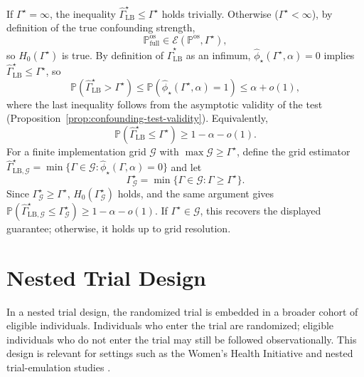 If \(\Gamma^\star = \infty\), the inequality \(\widehat{\Gamma}_{\mathrm{LB}}^{\star} \leq \Gamma^\star\) holds trivially. Otherwise (\(\Gamma^\star < \infty\)), by definition of the true confounding strength,
\[
  \mathbb{P}^{\mathrm{os}}_{\mathrm{full}}
  \in
  \mathcal{E}(\mathbb{P}^{\mathrm{os}},\Gamma^\star),
\]
so \(H_0(\Gamma^\star)\) is true. By definition of \(\widehat{\Gamma}_{\mathrm{LB}}^{\star}\) as an infimum, \(\widehat{\phi}_{\star}(\Gamma^\star,\alpha)=0\) implies \(\widehat{\Gamma}_{\mathrm{LB}}^{\star}\leq\Gamma^\star\), so
\[
  \mathbb{P}
  \left(
    \widehat{\Gamma}_{\mathrm{LB}}^{\star}>\Gamma^\star
  \right)
  \leq
  \mathbb{P}
  \left(
    \widehat{\phi}_{\star}(\Gamma^\star,\alpha)=1
  \right)
  \leq
  \alpha+o(1),
\]
where the last inequality follows from the asymptotic validity of the test (Proposition~\ref{prop:confounding-test-validity}). Equivalently,
\[
  \mathbb{P}
  \left(
    \widehat{\Gamma}_{\mathrm{LB}}^{\star}\leq\Gamma^\star
  \right)
  \geq
  1-\alpha-o(1).
\]
For a finite implementation grid \(\mathcal{G}\) with \(\max\mathcal{G}\geq\Gamma^\star\), define the grid estimator \(\widehat{\Gamma}_{\mathrm{LB},\mathcal{G}}^{\star}=\min\{\Gamma\in\mathcal{G}:\widehat{\phi}_{\star}(\Gamma,\alpha)=0\}\) and let
\[
  \Gamma^\star_{\mathcal{G}}
  =
  \min\{\Gamma\in\mathcal{G}:\Gamma\geq\Gamma^\star\}.
\]
Since \(\Gamma^\star_{\mathcal{G}}\geq\Gamma^\star\), \(H_0(\Gamma^\star_{\mathcal{G}})\) holds, and the same argument gives \(\mathbb{P}(\widehat{\Gamma}_{\mathrm{LB},\mathcal{G}}^{\star}\leq\Gamma^\star_{\mathcal{G}})\geq 1-\alpha-o(1)\). If \(\Gamma^\star\in\mathcal{G}\), this recovers the displayed guarantee; otherwise, it holds up to grid resolution.

\section{Nested Trial Design}
\label{app:confounding-nested-design}

In a nested trial design, the randomized trial is embedded in a broader cohort of eligible individuals. Individuals who enter the trial are randomized; eligible individuals who do not enter the trial may still be followed observationally. This design is relevant for settings such as the Women's Health Initiative \citep{anderson2003implementation} and nested trial-emulation studies \citep{degtiar2021conditional}.

